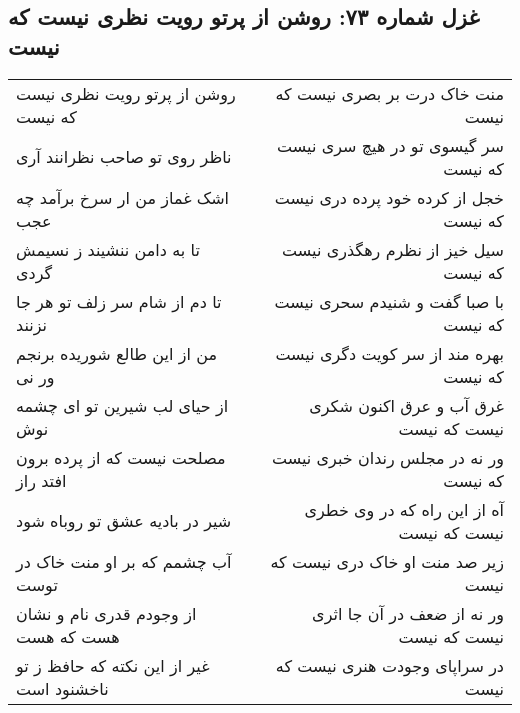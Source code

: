 \begin{center}
\section*{غزل شماره ۷۳: روشن از پرتو رویت نظری نیست که نیست}
\label{sec:sh073}
\begin{longtable}{l p{0.5cm} r}
روشن از پرتو رویت نظری نیست که نیست
&&
منت خاک درت بر بصری نیست که نیست
\\
ناظر روی تو صاحب نظرانند آری
&&
سر گیسوی تو در هیچ سری نیست که نیست
\\
اشک غماز من ار سرخ برآمد چه عجب
&&
خجل از کرده خود پرده دری نیست که نیست
\\
تا به دامن ننشیند ز نسیمش گردی
&&
سیل خیز از نظرم رهگذری نیست که نیست
\\
تا دم از شام سر زلف تو هر جا نزنند
&&
با صبا گفت و شنیدم سحری نیست که نیست
\\
من از این طالع شوریده برنجم ور نی
&&
بهره مند از سر کویت دگری نیست که نیست
\\
از حیای لب شیرین تو ای چشمه نوش
&&
غرق آب و عرق اکنون شکری نیست که نیست
\\
مصلحت نیست که از پرده برون افتد راز
&&
ور نه در مجلس رندان خبری نیست که نیست
\\
شیر در بادیه عشق تو روباه شود
&&
آه از این راه که در وی خطری نیست که نیست
\\
آب چشمم که بر او منت خاک در توست
&&
زیر صد منت او خاک دری نیست که نیست
\\
از وجودم قدری نام و نشان هست که هست
&&
ور نه از ضعف در آن جا اثری نیست که نیست
\\
غیر از این نکته که حافظ ز تو ناخشنود است
&&
در سراپای وجودت هنری نیست که نیست
\\
\end{longtable}
\end{center}
